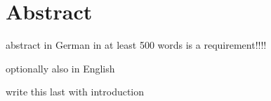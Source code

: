 \section*{Abstract}

\begin{notes}
	abstract in German in at least 500 words is a requirement!!!!

	optionally also in English

	write this last with introduction
\end{notes}
